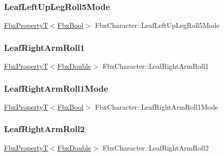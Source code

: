 \subsubsection{\texorpdfstring{Leaf\+Left\+Up\+Leg\+Roll5\+Mode}{LeafLeftUpLegRoll5Mode}}
{\footnotesize\ttfamily \hyperlink{class_fbx_property_t}{Fbx\+PropertyT}$<$\hyperlink{fbxtypes_8h_a92e0562b2fe33e76a242f498b362262e}{Fbx\+Bool}$>$ Fbx\+Character\+::\+Leaf\+Left\+Up\+Leg\+Roll5\+Mode}

\mbox{\label{class_fbx_character_a4fa8ff40ed607255a808f3452d2c0cee}} 
\subsubsection{\texorpdfstring{Leaf\+Right\+Arm\+Roll1}{LeafRightArmRoll1}}
{\footnotesize\ttfamily \hyperlink{class_fbx_property_t}{Fbx\+PropertyT}$<$\hyperlink{fbxtypes_8h_a171e72a1c46fc15c1a6c9c31948c1c5b}{Fbx\+Double}$>$ Fbx\+Character\+::\+Leaf\+Right\+Arm\+Roll1}

\mbox{\label{class_fbx_character_af27b4ee5dfd8968fa5e11554eb9b4ae2}} 
\subsubsection{\texorpdfstring{Leaf\+Right\+Arm\+Roll1\+Mode}{LeafRightArmRoll1Mode}}
{\footnotesize\ttfamily \hyperlink{class_fbx_property_t}{Fbx\+PropertyT}$<$\hyperlink{fbxtypes_8h_a92e0562b2fe33e76a242f498b362262e}{Fbx\+Bool}$>$ Fbx\+Character\+::\+Leaf\+Right\+Arm\+Roll1\+Mode}

\mbox{\label{class_fbx_character_a6444cc6b1cbea36a03d6555c7e0cf7b8}} 
\subsubsection{\texorpdfstring{Leaf\+Right\+Arm\+Roll2}{LeafRightArmRoll2}}
{\footnotesize\ttfamily \hyperlink{class_fbx_property_t}{Fbx\+PropertyT}$<$\hyperlink{fbxtypes_8h_a171e72a1c46fc15c1a6c9c31948c1c5b}{Fbx\+Double}$>$ Fbx\+Character\+::\+Leaf\+Right\+Arm\+Roll2}

